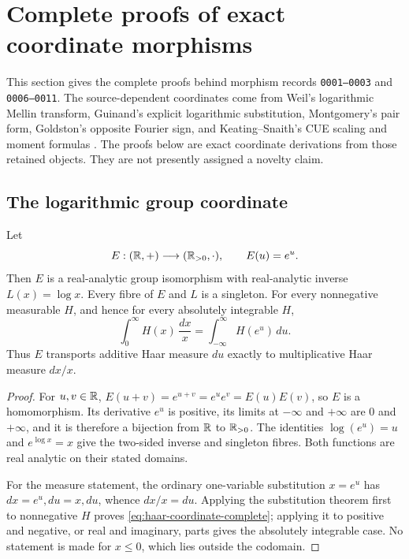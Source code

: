 \section{Complete proofs of exact coordinate morphisms}
\label{sec:complete-coordinate-proofs}

This section gives the complete proofs behind morphism records
\texttt{0001--0003} and \texttt{0006--0011}.  The source-dependent
coordinates come from Weil's logarithmic Mellin transform, Guinand's explicit
logarithmic substitution, Montgomery's pair form, Goldston's opposite Fourier
sign, and Keating--Snaith's CUE scaling and moment formulas
\cite[Collected Papers II, pp.~52--58]{weil1952}
\cite[p.~115]{guinand1948}
\cite[pp.~181--193]{montgomery1973}
\cite[Secs.~3--6]{goldston2004}
\cite[pp.~57--89]{keatingSnaith2000}.
The proofs below are exact coordinate derivations from those retained objects.
They are not presently assigned a novelty claim.

\subsection{The logarithmic group coordinate}

\begin{theorem}
\label{thm:exp-log-haar}
Let
\[
 E:(\mathbb R,+)\longrightarrow(\mathbb R_{>0},\cdot),\qquad E(u)=e^u.
\]
Then $E$ is a real-analytic group isomorphism with real-analytic inverse
$L(x)=\log x$.  Every fibre of $E$ and $L$ is a singleton.  For every
nonnegative measurable $H$, and hence for every absolutely integrable $H$,
\begin{equation}
 \int_0^\infty H(x)\,\frac{dx}{x}
 =\int_{-\infty}^{\infty}H(e^u)\,du.
 \label{eq:haar-coordinate-complete}
\end{equation}
Thus $E$ transports additive Haar measure $du$ exactly to multiplicative Haar
measure $dx/x$.
\end{theorem}

\begin{proof}
For $u,v\in\mathbb R$,
$E(u+v)=e^{u+v}=e^ue^v=E(u)E(v)$, so $E$ is a homomorphism.  Its derivative
$e^u$ is positive, its limits at $-\infty$ and $+\infty$ are $0$ and $+\infty$,
and it is therefore a bijection from $\mathbb R$ to $\mathbb R_{>0}$.  The identities
$\log(e^u)=u$ and $e^{\log x}=x$ give the two-sided inverse and singleton
fibres.  Both functions are real analytic on their stated domains.

For the measure statement, the ordinary one-variable substitution $x=e^u$
has $dx=e^u,du=x,du$, whence $dx/x=du$.  Applying the substitution theorem
first to nonnegative $H$ proves \eqref{eq:haar-coordinate-complete}; applying it
to positive and negative, or real and imaginary, parts gives the absolutely
integrable case.  No statement is made for $x\leq0$, which lies outside the
codomain.
\end{proof}

